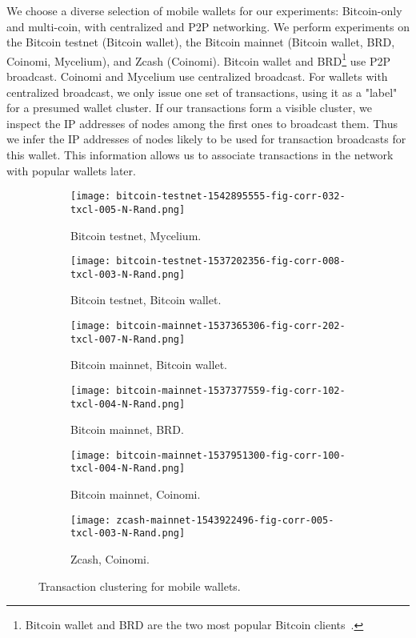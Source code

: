 We choose a diverse selection of mobile wallets for our experiments: Bitcoin-only and multi-coin, with centralized and P2P networking.
We perform experiments on the Bitcoin testnet (Bitcoin wallet), the Bitcoin mainnet (Bitcoin wallet, BRD, Coinomi, Mycelium), and Zcash (Coinomi).
Bitcoin wallet and BRD\footnote{Bitcoin wallet and BRD are the two most popular Bitcoin clients~\cite{Wang2017}.} use P2P broadcast.
Coinomi and Mycelium use centralized broadcast.
For wallets with centralized broadcast, we only issue one set of transactions, using it as a "label" for a presumed wallet cluster.
If our transactions form a visible cluster, we inspect the IP addresses of nodes among the first ones to broadcast them.
Thus we infer the IP addresses of nodes likely to be used for transaction broadcasts for this wallet.
This information allows us to associate transactions in the network with popular wallets later.

\begin{figure}
	\centering
	\begin{subfigure}{.5\textwidth}
		\centering
		\texttt{[image: bitcoin-testnet-1542895555-fig-corr-032-txcl-005-N-Rand.png]}
		\caption{Bitcoin testnet, Mycelium.}
	\end{subfigure}%
	\begin{subfigure}{.5\textwidth}
		\centering
		\texttt{[image: bitcoin-testnet-1537202356-fig-corr-008-txcl-003-N-Rand.png]}
		\caption{Bitcoin testnet, Bitcoin wallet.}
	\end{subfigure}
	\begin{subfigure}{.5\textwidth}
		\centering
		\texttt{[image: bitcoin-mainnet-1537365306-fig-corr-202-txcl-007-N-Rand.png]}
		\caption{Bitcoin mainnet, Bitcoin wallet.}
	\end{subfigure}%
	\begin{subfigure}{.5\textwidth}
		\centering
		\texttt{[image: bitcoin-mainnet-1537377559-fig-corr-102-txcl-004-N-Rand.png]}
		\caption{Bitcoin mainnet, BRD.}
	\end{subfigure}
	\begin{subfigure}{.5\textwidth}
		\centering
		\texttt{[image: bitcoin-mainnet-1537951300-fig-corr-100-txcl-004-N-Rand.png]}
		\caption{Bitcoin mainnet, Coinomi.}
	\end{subfigure}%
	\begin{subfigure}{.5\textwidth}
		\centering
		\texttt{[image: zcash-mainnet-1543922496-fig-corr-005-txcl-003-N-Rand.png]}
		\caption{Zcash, Coinomi.}
	\end{subfigure}
	\caption{Transaction clustering for mobile wallets.}
	\label{fig:clustering-all}
\end{figure}

